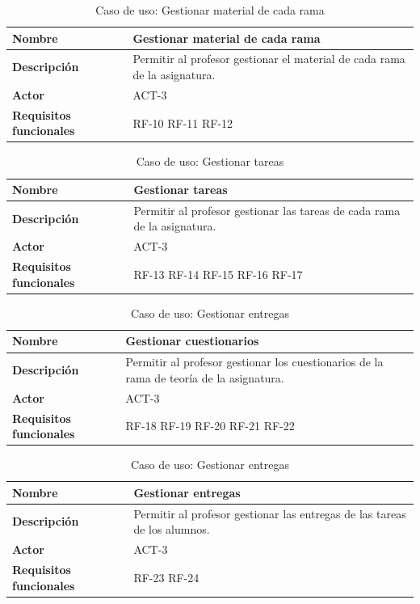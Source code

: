 \begin{table}[H]
\centering
\begin{tabularx}{\textwidth}{
  |>{\centering\arraybackslash}l
  |>{\centering\arraybackslash}X|}
\hline
\textbf{Nombre} & {\textbf{Gestionar material de cada rama}} \\ \hline

\textbf{Descripción} & Permitir al profesor gestionar el material de cada rama de la asignatura. \\ \hline
\textbf{Actor} & ACT-3\\ \hline
\textbf{Requisitos funcionales} & RF-10 RF-11 RF-12 \\ \hline
\end{tabularx}
\caption{Caso de uso: Gestionar material de cada rama}
\end{table}
\begin{table}[H]
\centering
\begin{tabularx}{\textwidth}{
  |>{\centering\arraybackslash}l
  |>{\centering\arraybackslash}X|}
\hline
\textbf{Nombre} & {\textbf{Gestionar tareas}} \\ \hline

\textbf{Descripción} & Permitir al profesor gestionar las tareas de cada rama de la asignatura. \\ \hline
\textbf{Actor} & ACT-3\\ \hline
\textbf{Requisitos funcionales} & RF-13 RF-14 RF-15 RF-16 RF-17 \\ \hline
\end{tabularx}
\caption{Caso de uso: Gestionar tareas}
\end{table}
\begin{table}[H]
\centering
\begin{tabularx}{\textwidth}{
  |>{\centering\arraybackslash}l
  |>{\centering\arraybackslash}X|}
\hline
\textbf{Nombre} & {\textbf{Gestionar cuestionarios}} \\ \hline

\textbf{Descripción} & Permitir al profesor gestionar los cuestionarios de la rama de teoría de la asignatura. \\ \hline
\textbf{Actor} & ACT-3\\ \hline
\textbf{Requisitos funcionales} & RF-18 RF-19 RF-20 RF-21 RF-22 \\ \hline
\end{tabularx}
\caption{Caso de uso: Gestionar entregas}
\end{table}
\begin{table}[H]
\centering
\begin{tabularx}{\textwidth}{
  |>{\centering\arraybackslash}l
  |>{\centering\arraybackslash}X|}
\hline
\textbf{Nombre} & {\textbf{Gestionar entregas}} \\ \hline

\textbf{Descripción} & Permitir al profesor gestionar las entregas de las tareas de los alumnos. \\ \hline
\textbf{Actor} & ACT-3\\ \hline
\textbf{Requisitos funcionales} & RF-23 RF-24\\ \hline
\end{tabularx}
\caption{Caso de uso: Gestionar entregas}
\end{table}
